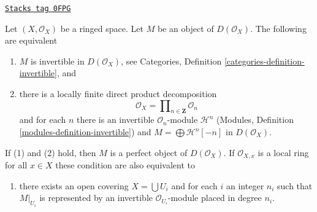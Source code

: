 \begin{lemma}
\label{cohomology-lemma-invertible-derived}
\href{https://stacks.math.columbia.edu/tag/0FPG}{\texttt{Stacks tag 0FPG}}

Let $(X, \mathcal{O}_X)$ be a ringed space. Let $M$ be an object
of $D(\mathcal{O}_X)$. The following are equivalent
\begin{enumerate}
\item $M$ is invertible in $D(\mathcal{O}_X)$, see
Categories, Definition \ref{categories-definition-invertible}, and
\item there is a locally finite direct product decomposition
$$
\mathcal{O}_X = \prod\nolimits_{n \in \mathbf{Z}} \mathcal{O}_n
$$
and for each $n$ there is an invertible $\mathcal{O}_n$-module
$\mathcal{H}^n$ (Modules, Definition \ref{modules-definition-invertible})
and $M = \bigoplus \mathcal{H}^n[-n]$ in $D(\mathcal{O}_X)$.
\end{enumerate}
If (1) and (2) hold, then $M$ is a perfect object of $D(\mathcal{O}_X)$. If
$\mathcal{O}_{X, x}$ is a local ring for all $x \in X$ these condition
are also equivalent to
\begin{enumerate}
\item[(3)] there exists an open covering $X = \bigcup U_i$
and for each $i$ an integer $n_i$ such that $M|_{U_i}$
is represented by an invertible $\mathcal{O}_{U_i}$-module
placed in degree $n_i$.
\end{enumerate}
\end{lemma}

